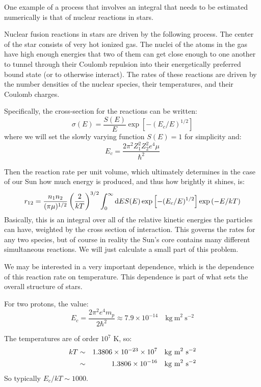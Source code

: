 One example of a process that involves an integral that needs to be
estimated numerically is that of nuclear reactions in stars. 

Nuclear fusion reactions in stars are driven by the following
process. The center of the star consists of very hot ionized gas. The
nuclei of the atoms in the gas have high enough energies that two of
them can get close enough to one another to tunnel through their
Coulomb repulsion into their energetically preferred bound state (or
to otherwise interact). The rates of these reactions are driven by the
number densities of the nuclear species, their temperatures, and their
Coulomb charges. 

Specifically, the cross-section for the reactions can be written:
\begin{equation}
\sigma(E) = \frac{S(E)}{E} \exp\left[-(E_c / E)^{1/2}\right]
\end{equation}
where we will set the slowly varying function $S(E)=1$ for simplicity
and:
\begin{equation}
E_c = \frac{2\pi^2 Z_1^2 Z_2^2 e^4 \mu}{\hbar^2}
\end{equation}

Then the reaction rate per unit volume, which ultimately determines in
the case of our Sun how much energy is produced, and thus how brightly
it shines, is:
\begin{equation}
r_{12} = \frac{n_1 n_2}{(\pi \mu)^{1/2}}
\left(\frac{2}{kT}\right)^{3/2}  \int_0^\infty {\rm d}E S(E)
\exp\left[-(E_c/E)^{1/2}\right] \exp\left(-E/kT\right)
\end{equation}
Basically, this is an integral over all of the relative kinetic
energies the particles can have, weighted by the cross section of
interaction.
This governs the rates for any two species, but of course in reality
the Sun's core contains many different simultaneous reactions. We will
just calculate a small part of this problem.

We may be interested in a very important dependence, which is the
dependence of this reaction rate on temperature. This dependence is
part of what sets the overall structure of stars. 

For two protons, the value:
\begin{equation}
E_c = \frac{2 \pi^2 e^4 m_p}{2 \hbar^2} \approx 7.9 \times 10^{-14}
\mathrm{\quad kg~m}^2\mathrm{~s}^{-2}
\end{equation}

The temperatures are of order $10^7$ K, so:
\begin{eqnarray}
  kT &\sim&
  1.3806 \times 10^{-23} \times 10^{7} \mathrm{\quad kg~m}^2\mathrm{~s}^{-2}\cr
&\sim& 
  1.3806 \times 10^{-16} \mathrm{\quad kg~m}^2\mathrm{~s}^{-2}
\end{eqnarray}
So typically $E_c/kT \sim 1000$.


